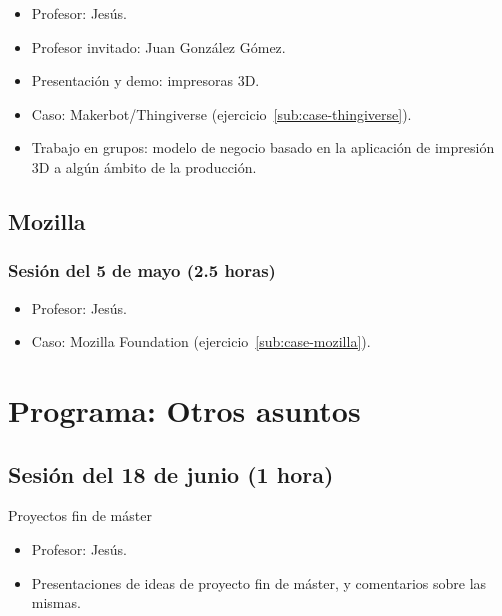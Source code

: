 \documentclass[a4paper,12pt]{article}
\begin{document}
\begin{itemize}
\item Profesor: Jesús.
\item Profesor invitado: Juan González Gómez.
\item Presentación y demo: impresoras 3D.
\item Caso: Makerbot/Thingiverse (ejercicio~\ref{sub:case-thingiverse}).
\item Trabajo en grupos: modelo de negocio basado en la aplicación de impresión 3D a algún ámbito de la producción.
\end{itemize}

\subsection{Mozilla}

\subsubsection{Sesión del 5 de mayo (2.5 horas)}

\begin{itemize}
\item Profesor: Jesús.
\item Caso: Mozilla Foundation (ejercicio~\ref{sub:case-mozilla}).
\end{itemize}


\section{Programa: Otros asuntos}

\subsection{Sesión del 18 de junio (1 hora)}

Proyectos fin de máster

\begin{itemize}
\item Profesor: Jesús.
\item Presentaciones de ideas de proyecto fin de máster, y comentarios sobre las mismas.
\end{itemize}
\end{document}
